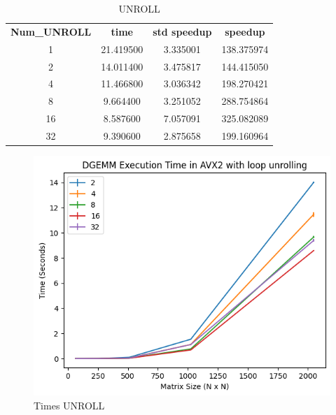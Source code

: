 \documentclass[12pt]{article}
\begin{document}
\begin{table}[h]
    \centering
    \label{tab:unroll}
    \begin{tabular}{cccc}
        \textbf{Num\_UNROLL} & \textbf{time} & \textbf{std speedup} & \textbf{speedup} \\
        1 & 21.419500 & 3.335001 & 138.375974 \\
        2 & 14.011400 & 3.475817 & 144.415050 \\
        4 & 11.466800 & 3.036342 & 198.270421 \\
        8 & 9.664400 & 3.251052 & 288.754864 \\
        16 & 8.587600 & 7.057091 & 325.082089 \\
        32 & 9.390600 & 2.875658 & 199.160964 \\
    \end{tabular}
    \caption{UNROLL}
\end{table}

\begin{figure}[h]
    \centering
    \includegraphics[scale=0.6]{figures/times_unroll.png}
    \caption{Times UNROLL}
    \label{fig:times-unroll}
\end{figure}
\end{document}

